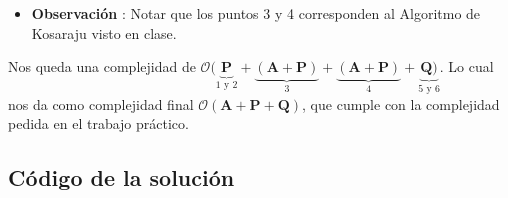 \begin{itemize}
	\item \textbf{Observación} : Notar que los puntos 3 y 4 corresponden al Algoritmo de Kosaraju visto en clase.
\end{itemize}

Nos queda una complejidad de $\mathcal{O}(\underset{1 \text{ y } 2}{\underbrace{\textbf{P}}} + \underset{3}{\underbrace{(\textbf{A} + \textbf{P})}} + \underset{4}{\underbrace{(\textbf{A} + \textbf{P})}} + \underset{5 \text{ y } 6}{\underbrace{\textbf{Q})}}$. Lo cual nos da como complejidad final $\mathcal{O}(\textbf{A} + \textbf{P} + \textbf{Q})$, que cumple con la complejidad pedida en el trabajo práctico.	 
\newpage
\subsection{Código de la solución}

